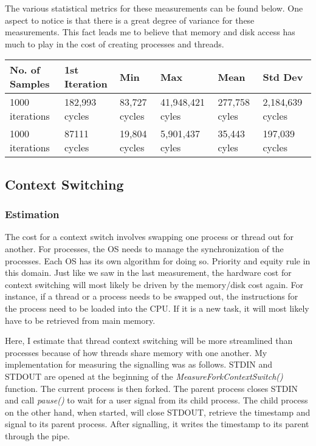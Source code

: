 \documentclass[paper=a4, fontsize=11pt]{scrartcl}
\numberwithin{equation}{section}        %
\numberwithin{figure}{section}          %
\numberwithin{table}{section}               %
\begin{document}
The various statistical metrics for these measurements can be found below.  One aspect to notice is that there is a great degree of variance for these measurements.  This fact leads me to believe that memory and disk access has much to play in the cost of creating processes and threads.

\begin{center}
    \begin{tabular}{ | l | l | l | l | l | l |}
    \hline
    No. of Samples & 1st Iteration & Min & Max & Mean & Std Dev \\ \hline
    1000 iterations & 182,993 cycles & 83,727 cycles & 41,948,421 cyles & 277,758 cyles & 2,184,639 cycles \\ 
    1000 iterations & 87111 cycles & 19,804 cycles & 5,901,437 cyles & 35,443 cyles & 197,039 cycles \\ 
    \hline
    \end{tabular}
\end{center}

\subsection{Context Switching}

\subsubsection{Estimation}

The cost for a context switch involves swapping one process or thread out for another.  For processes, the OS needs to manage the synchronization of the processes.  Each OS has its own algorithm for doing so.  Priority and equity rule in this domain.  Just like we saw in the last measurement, the hardware cost for context switching will most likely be driven by the memory/disk cost again.  For instance, if a thread or a process needs to be swapped out, the instructions for the process need to be loaded into the CPU.  If it is a new task, it will most likely have to be retrieved from main memory.

Here, I estimate that thread context switching will be more streamlined than processes because of how threads share memory with one another.  My implementation for measuring the signalling was as follows.  STDIN and STDOUT are opened at the beginning of the  \textit{MeasureForkContextSwitch()} function.  The current process is then forked.  The parent process closes STDIN and call \textit{pause()} to wait for a user signal from its child process.  The child process on the other hand, when started, will close STDOUT, retrieve the timestamp and signal to its parent process.  After signalling, it writes the timestamp to its parent through the pipe.
\end{document}
